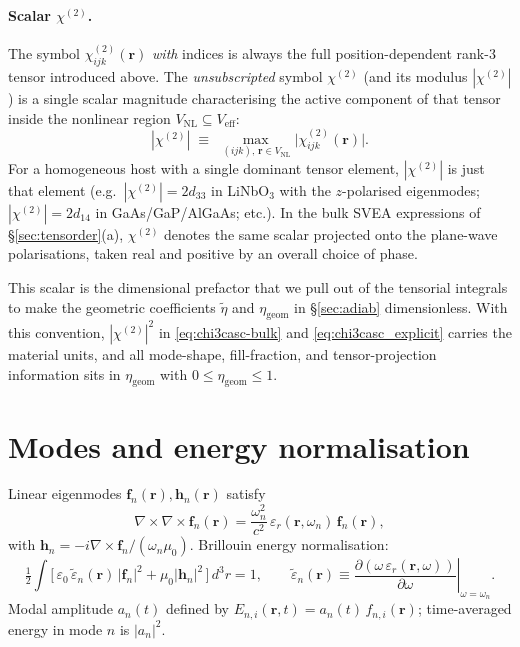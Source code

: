 \documentclass[11pt,a4paper]{article}
\newcommand{\eps}{\varepsilon}
\newcommand{\epstilde}{\widetilde{\varepsilon}}
\newcommand{\bvec}[1]{\mathbf{#1}}
\newcommand{\f}{\bvec{f}}
\newcommand{\h}{\bvec{h}}
\newcommand{\ri}{\bvec{r}}
\newcommand{\dthreer}{\,d^{3}r}
\newcommand{\chitwo}{\chi^{(2)}}
\begin{document}
\paragraph{Scalar $\chitwo$.}
The symbol $\chitwo_{ijk}(\ri)$ \emph{with} indices is always the
full position-dependent rank-3 tensor introduced above. The
\emph{unsubscripted} symbol $\chitwo$ (and its modulus $|\chitwo|$) is a
single scalar magnitude characterising the active component of that
tensor inside the nonlinear region $V_\text{NL}\subseteq V_\text{eff}$:
\begin{equation}
  \boxed{\;|\chitwo|\;\equiv\;\max_{\,(ijk),\,\ri\in V_\text{NL}}
        \bigl|\chitwo_{ijk}(\ri)\bigr|.\;}
  \label{eq:scalar-chi2}
\end{equation}
For a homogeneous host with a single dominant tensor element, $|\chitwo|$
is just that element (e.g.\ $|\chitwo|\!=\!2d_{33}$ in LiNbO$_3$ with the
$z$-polarised eigenmodes; $|\chitwo|\!=\!2d_{14}$ in GaAs/GaP/AlGaAs; etc.). In the bulk SVEA expressions of
\S\ref{sec:tensorder}(a), $\chitwo$ denotes the same scalar projected
onto the plane-wave polarisations, taken real and positive by an overall
choice of phase.

This scalar is the dimensional prefactor that we pull out of the
tensorial integrals to make the geometric coefficients $\widetilde\eta$
and $\eta_\text{geom}$ in \S\ref{sec:adiab} dimensionless. With this
convention, $|\chitwo|^2$ in \eqref{eq:chi3casc-bulk} and
\eqref{eq:chi3casc_explicit} carries the material units, and all
mode-shape, fill-fraction, and tensor-projection information sits in
$\eta_\text{geom}$ with $0\le\eta_\text{geom}\le 1$.

\section{Modes and energy normalisation}

Linear eigenmodes $\f_n(\ri),\h_n(\ri)$ satisfy
\begin{equation}
  \nabla\!\times\!\nabla\!\times\!\f_n(\ri)
  =\frac{\omega_n^2}{c^2}\,\eps_r(\ri,\omega_n)\,\f_n(\ri),
\end{equation}
with $\h_n=-i\nabla\!\times\!\f_n/(\omega_n\mu_0)$. Brillouin energy normalisation:
\begin{equation}
  \tfrac12\!\int\!\!\bigl[\,\eps_0\,\epstilde_n(\ri)\,|\f_n|^2+\mu_0|\h_n|^2\,\bigr]\dthreer=1,
  \qquad
  \epstilde_n(\ri)\equiv\left.\frac{\partial(\omega\,\eps_r(\ri,\omega))}{\partial\omega}\right|_{\omega=\omega_n}.
\label{eq:Brillouin}
\end{equation}
Modal amplitude $a_n(t)$ defined by $E_{n,i}(\ri,t)=a_n(t)\,f_{n,i}(\ri)$; time-averaged energy in mode $n$ is $|a_n|^2$.
\end{document}
